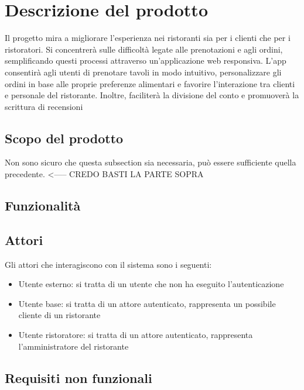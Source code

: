 \section{Descrizione del prodotto}
Il progetto mira a migliorare l'esperienza nei ristoranti sia per i clienti che per i ristoratori. Si concentrerà sulle difficoltà legate alle prenotazioni e agli ordini, 
semplificando questi processi attraverso un'applicazione web responsiva. L'app consentirà agli utenti di prenotare tavoli in modo intuitivo, personalizzare gli ordini in base alle proprie preferenze alimentari e favorire 
l'interazione tra clienti e personale del ristorante. Inoltre, faciliterà la divisione del conto e promuoverà la scrittura di recensioni

\subsection{Scopo del prodotto}
Non sono sicuro che questa subsection sia necessaria, può essere sufficiente
quella precedente. <----- CREDO BASTI LA PARTE SOPRA

\subsection{Funzionalità}

\subsection{Attori}
Gli attori che interagiscono con il sistema sono i seguenti:
\begin{itemize}
    \item Utente esterno: si tratta di un utente che non ha eseguito l'autenticazione
    \item Utente base: si tratta di un attore autenticato, rappresenta un possibile cliente di un ristorante
    \item Utente ristoratore: si tratta di un attore autenticato, rappresenta l'amministratore del ristorante
\end{itemize}



\subsection{Requisiti non funzionali}

